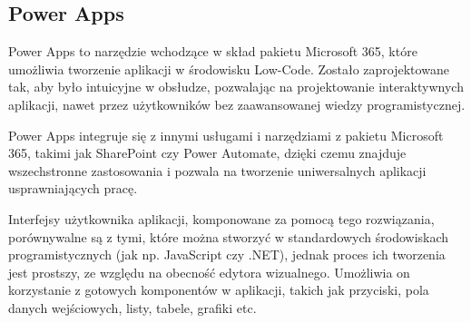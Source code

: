 \subsection{Power Apps}

Power Apps to narzędzie wchodzące w skład pakietu Microsoft 365, które umożliwia tworzenie aplikacji w środowisku Low-Code. Zostało zaprojektowane tak, aby było intuicyjne w obsłudze, pozwalając na projektowanie interaktywnych aplikacji, nawet przez użytkowników bez zaawansowanej wiedzy programistycznej.

Power Apps integruje się z innymi usługami i narzędziami z pakietu Microsoft 365, takimi jak SharePoint czy Power Automate, dzięki czemu znajduje wszechstronne zastosowania i pozwala na tworzenie uniwersalnych aplikacji usprawniających pracę.

Interfejsy użytkownika aplikacji, komponowane za pomocą tego rozwiązania, porównywalne są z tymi, które można stworzyć w standardowych środowiskach programistycznych (jak np. JavaScript czy .NET), jednak proces ich tworzenia jest prostszy, ze względu na obecność edytora wizualnego. Umożliwia on korzystanie z gotowych komponentów w aplikacji, takich jak przyciski, pola danych wejściowych, listy, tabele, grafiki etc.


